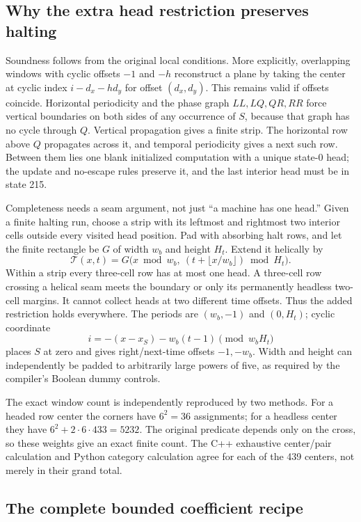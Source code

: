 \documentclass[11pt]{article}
\begin{document}
\subsection{Why the extra head restriction preserves halting}

Soundness follows from the original local conditions. More explicitly, overlapping windows with cyclic offsets $-1$ and $-h$ reconstruct a plane by taking the center at cyclic index $i-d_x-hd_y$ for offset $(d_x,d_y)$. This remains valid if offsets coincide. Horizontal periodicity and the phase graph $LL,LQ,QR,RR$ force vertical boundaries on both sides of any occurrence of $S$, because that graph has no cycle through $Q$. Vertical propagation gives a finite strip. The horizontal row above $Q$ propagates across it, and temporal periodicity gives a next such row. Between them lies one blank initialized computation with a unique state-0 head; the update and no-escape rules preserve it, and the last interior head must be in state 215.

Completeness needs a seam argument, not just ``a machine has one head.'' Given a finite halting run, choose a strip with its leftmost and rightmost two interior cells outside every visited head position. Pad with absorbing halt rows, and let the finite rectangle be $G$ of width $w_b$ and height $H_t$. Extend it helically by
\[
\mathcal T(x,t)=G\bigl(x\bmod w_b,\ (t+\lfloor x/w_b\rfloor)\bmod H_t\bigr).
\]
Within a strip every three-cell row has at most one head. A three-cell row crossing a helical seam meets the boundary or only its permanently headless two-cell margins. It cannot collect heads at two different time offsets. Thus the added restriction holds everywhere. The periods are $(w_b,-1)$ and $(0,H_t)$; cyclic coordinate
\[
i=-(x-x_S)-w_b(t-1)\pmod{w_bH_t}
\]
places $S$ at zero and gives right/next-time offsets $-1,-w_b$.
Width and height can independently be padded to arbitrarily large powers of five, as required by the compiler's Boolean dummy controls.

The exact window count is independently reproduced by two methods. For a headed row center the corners have $6^2=36$ assignments; for a headless center they have $6^2+2\cdot6\cdot433=5232$. The original predicate depends only on the cross, so these weights give an exact finite count. The C++ exhaustive center/pair calculation and Python category calculation agree for each of the 439 centers, not merely in their grand total.

\subsection{The complete bounded coefficient recipe}
\end{document}
